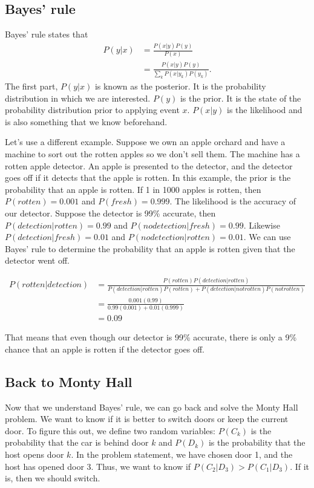 \documentclass[12pt]{article} %
\begin{document}
\subsection{Bayes' rule}
Bayes' rule states that
\begin{align}
P(y | x) &= \frac{P(x | y)P(y)}{P(x)} \\
&= \frac{P(x | y)P(y)}{\sum_{k}^{}P(x | y_k)P(y_k)}.
\end{align}
The first part, $P(y | x)$ is known as the posterior.  It is the probability distribution in which we are interested.  $P(y)$ is the prior.  It is the state of the probability distribution prior to applying event $x$.  $P(x | y)$ is the likelihood and is also something that we know beforehand.

Let's use a different example.  Suppose we own an apple orchard and have a machine to sort out the rotten apples so we don't sell them.  The machine has a rotten apple detector.  An apple is presented to the detector, and the detector goes off if it detects that the apple is rotten.  In this example, the prior is the probability that an apple is rotten.  If 1 in 1000 apples is rotten, then $P(rotten) = 0.001$ and $P(fresh) = 0.999$.  The likelihood is the accuracy of our detector.  Suppose the detector is 99\% accurate, then $P(detection | rotten) = 0.99$ and $P(no detection | fresh) = 0.99$.  Likewise $P(detection | fresh) = 0.01$ and $P(no detection | rotten) = 0.01$.  We can use Bayes' rule to determine the probability that an apple is rotten given that the detector went off.

\begin{align}
P(rotten | detection) &= \frac{P(rotten)P(detection | rotten)}{P(detection | rotten)P(rotten) + P(detection | not rotten)P(not rotten)} \\
&= \frac{0.001(0.99)}{0.99(0.001) + 0.01(0.999)} \\
&= 0.09
\end{align}

That means that even though our detector is 99\% accurate, there is only a 9\% chance that an apple is rotten if the detector goes off.

\subsection{Back to Monty Hall}
Now that we understand Bayes' rule, we can go back and solve the Monty Hall problem.  We want to know if it is better to switch doors or keep the current door.  To figure this out, we define two random variables: $P(C_k)$ is the probability that the car is behind door $k$ and $P(D_k)$ is the probability that the host opens door $k$.  In the problem statement, we have chosen door 1, and the host has opened door 3.  Thus, we want to know if $P(C_2 | D_3) > P(C_1 | D_3)$.  If it is, then we should switch.
\end{document}
